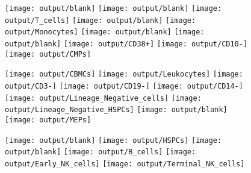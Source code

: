 \documentclass[11pt]{article}
\begin{document}
\begin{figure}[htbp]
\begin{minipage}[t]{0.125\textwidth}
  \end{minipage}%
  \begin{minipage}[t]{0.125\textwidth}
    \centering
    \vspace{-0.3871\linewidth} %
    \texttt{[image: output/blank]}
    \texttt{[image: output/blank]}
    \texttt{[image: output/T\_cells]}
    \texttt{[image: output/blank]}
    \texttt{[image: output/Monocytes]}
    \texttt{[image: output/blank]}
    \texttt{[image: output/blank]}
    \texttt{[image: output/CD38+]}
    \texttt{[image: output/CD10-]}
    \texttt{[image: output/CMPs]}
  \end{minipage}%
  \begin{minipage}[t]{0.125\textwidth}
    \centering
    \texttt{[image: output/CBMCs]}
    \texttt{[image: output/Leukocytes]}
    \texttt{[image: output/CD3-]}
    \texttt{[image: output/CD19-]}
    \texttt{[image: output/CD14-]}
    \texttt{[image: output/Lineage\_Negative\_cells]}
    \texttt{[image: output/Lineage\_Negative\_HSPCs]}
    \texttt{[image: output/blank]}
    \texttt{[image: output/MEPs]}
  \end{minipage}%
  \begin{minipage}[t]{0.125\textwidth}
    \centering
    \vspace{-0.3871\linewidth} %
    \texttt{[image: output/blank]}
    \texttt{[image: output/HSPCs]}
    \texttt{[image: output/blank]}
    \texttt{[image: output/B\_cells]}
    \texttt{[image: output/Early\_NK\_cells]}
    \texttt{[image: output/Terminal\_NK\_cells]}

\end{minipage}
\end{figure}
\end{document}
